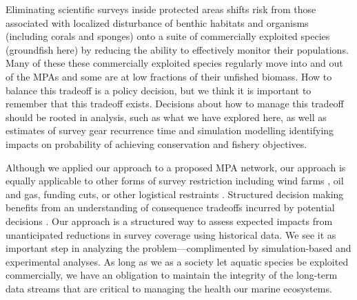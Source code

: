 \documentclass[12pt]{article}
\begin{document}

Eliminating scientific surveys inside protected areas shifts risk from those associated with localized disturbance of benthic habitats and organisms (including corals and sponges) onto a suite of commercially exploited species (groundfish here) by reducing the ability to effectively monitor their populations.
Many of these these commercially exploited species regularly move into and out of the MPAs and some are at low fractions of their unfished biomass.
How to balance this tradeoff is a policy decision, but we think it is important to remember that this tradeoff exists.
Decisions about how to manage this tradeoff should be rooted in analysis, such as what we have explored here, as well as estimates of survey gear recurrence time \citep{benoit2020national} and simulation modelling identifying impacts on probability of achieving conservation and fishery objectives.

Although we applied our approach to a proposed MPA network, our approach is equally applicable to other forms of survey restriction including wind farms \citep{hare2022}, oil and gas, funding cuts, or other logistical restraints \citep{ices2023}.
Structured decision making benefits from an understanding of consequence tradeoffs incurred by potential decisions \citep{gregory2012}.
Our approach is a structured way to assess expected impacts from unanticipated reductions in survey coverage using historical data.
We see it as important step in analyzing the problem---complimented by simulation-based and experimental analyses.
As long as we as a society let aquatic species be exploited commercially, we have an obligation to maintain the integrity of the long-term data streams that are critical to managing the health our marine ecosystems.

\end{document}

